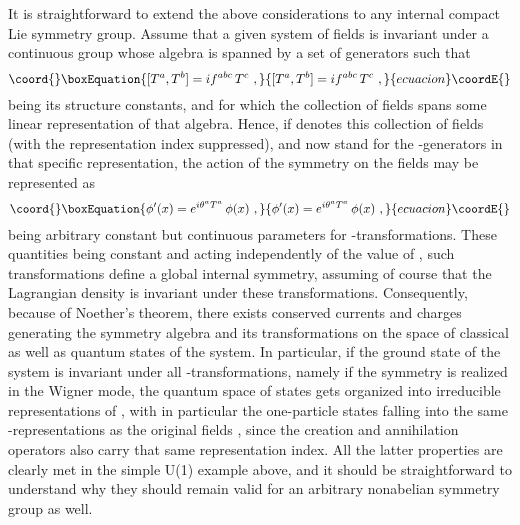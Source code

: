 \documentclass[a4paper,11pt]{article}
\begin{document}
It is straightforward to extend the above considerations to any internal
compact Lie symmetry group. Assume that a given system of fields is invariant
under a continuous group \coordHE{} whose algebra is spanned by a set of generators
\coordHE{} such that
\begin{equation}\coord{}\boxEquation{
[T^a,T^b]=if^{abc}\,T^c\ ,
}{
[T^a,T^b]=if^{abc}\,T^c\ ,
}{ecuacion}\coordE{}\end{equation}
\coordHE{} being its structure constants, and for which the collection of
fields spans some linear representation of that algebra. Hence, if
\coordHE{} denotes this collection of fields (with the representation index
suppressed), and \coordHE{} now stand for the \coordHE{}-generators in that specific
representation, the action of the symmetry on the fields may be represented
as
\begin{equation}\coord{}\boxEquation{
\phi'(x)=e^{i\theta^aT^a}\,\phi(x)\ ,
}{
\phi'(x)=e^{i\theta^aT^a}\,\phi(x)\ ,
}{ecuacion}\coordE{}\end{equation}
\coordHE{} being arbitrary constant but continuous parameters for 
\coordHE{}-transformations. These quantities being constant and acting independently
of the value of \coordHE{}, such transformations define a global internal
symmetry, assuming of course that the Lagrangian density 
\coordHE{} is invariant under these transformations.
Consequently, because of Noether's theorem, there exists conserved
currents \coordHE{} and charges \coordHE{}
generating the symmetry algebra and its transformations on the space
of classical as well as quantum states of the system. In particular,
if the ground state of the system is invariant under all \coordHE{}-transformations,
namely if the symmetry is realized in the Wigner mode,
the quantum space of states gets organized into irreducible representations 
of \coordHE{}, with in particular the one-particle states falling into the same 
\coordHE{}-representations as the original fields \coordHE{}, since the creation 
and annihilation operators also carry that same representation index. 
All the latter properties are clearly met in the simple U(1) example above,
and it should be straightforward to understand why they should remain valid
for an arbitrary nonabelian symmetry group as well.
\end{document}
